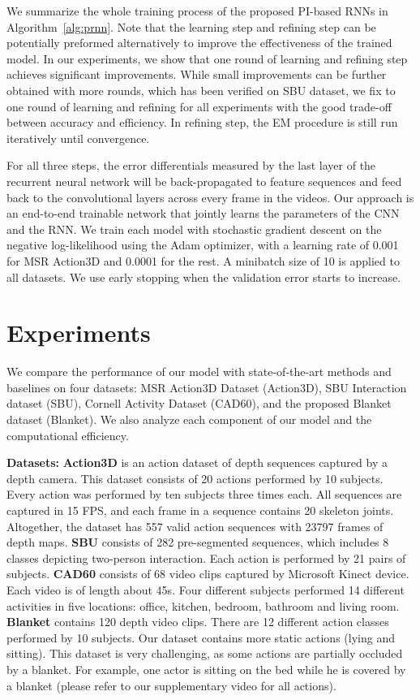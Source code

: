 \documentclass[10pt,twocolumn,letterpaper]{article}
\begin{document}
We summarize the whole training process of the proposed PI-based RNNs in Algorithm~\ref{alg:prnn}. Note that the learning step and refining step can be potentially preformed alternatively to improve the effectiveness of the trained model. In our experiments, we show that one round of learning and refining step achieves significant improvements. While small improvements can be further obtained with more rounds, which has been verified on SBU dataset, we fix to one round of learning and refining for all experiments with the good trade-off between accuracy and efficiency. In refining step, the EM procedure is still run iteratively until convergence. 

For all three steps, the error differentials measured by the last layer of the recurrent neural network will be back-propagated to feature sequences and feed back to the convolutional layers across every frame in the videos. Our approach is an end-to-end trainable network that jointly learns the parameters of the CNN and the RNN. We train each model with stochastic gradient descent on the negative log-likelihood using the Adam optimizer, with a learning rate of 0.001 for MSR Action3D and 0.0001 for the rest. A minibatch size of 10 is applied to all datasets. We use early stopping when the validation error starts to increase.



\section{Experiments}
We compare the performance of our model with state-of-the-art methods and baselines on four datasets: MSR Action3D Dataset \cite{Wanqing_cvprw_2010} (Action3D), SBU Interaction dataset \cite{kiwon_cvprw_2012} (SBU), Cornell Activity Dataset \cite{sung_rgbdactivity_2012}(CAD60), and the proposed Blanket dataset (Blanket). We also analyze each component of our model and the computational efficiency. 


\noindent \textbf{Datasets:} \textbf{Action3D} is an action dataset of depth sequences captured by a depth camera.  This dataset consists of 20 actions performed by 10 subjects. Every action was performed by ten subjects three times each. All sequences are captured in 15 FPS, and each frame in a sequence contains 20 skeleton joints. Altogether, the dataset has 557 valid action sequences with 23797 frames of depth maps. \textbf{SBU} consists of 282 pre-segmented sequences, which includes 8 classes depicting two-person interaction. Each action is performed by 21 pairs of subjects. \textbf{CAD60} consists of 68 video clips captured by Microsoft Kinect device. Each video is of length about 45s. Four different subjects performed 14 different activities in five locations: office, kitchen, bedroom, bathroom and living room. \textbf{Blanket} contains 120 depth video clips. There are 12 different action classes performed by 10 subjects. Our dataset contains more static actions (\eg lying and sitting). This dataset is very challenging, as some actions are partially occluded by a blanket. For example, one actor is sitting on the bed while he is covered by a blanket (please refer to our supplementary video for all actions). 
\end{document}
